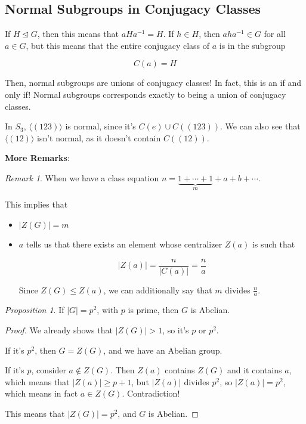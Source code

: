 \documentclass[12pt]{article}
\newcommand{\lr}[1]{\langle #1 \rangle}
\theoremstyle{remark}
\newtheorem{proposition}{Proposition}
\theoremstyle{remark}
\theoremstyle{remark}
\theoremstyle{remark}
\newtheorem*{remark}{Remark}
\theoremstyle{remark}
\begin{document}
\subsection{Normal Subgroups in Conjugacy Classes}

If $H \trianglelefteq G$, then this means that $aHa^{-1} = H$. If $h \in H$,
then $aha^{-1} \in G$ for all $a \in G$, but this means that the entire
conjugacy class of $a$ is in the subgroup

\[
  C(a) = H
\]

Then, normal subgroups are unions of conjugacy classes! In fact, this is an if
and only if! Normal subgroups corresponds exactly to being a union of conjugacy
classes.

In $S_3$, $\lr {(123)}$ is normal, since it's $C(e) \cup C((123))$. We can also
see that $\lr {(12)}$ isn't normal, as it doesn't contain $C((12))$.

{\bf More Remarks}:
\begin{remark}
  When we have a class equation $n = \underbrace{1 + \cdots + 1}_{m} + a + b +
  \cdots$.

  This implies that

  \begin{itemize}
    \item $|Z(G)| = m$
    \item $a$ tells us that there exists an element whose centralizer $Z(a)$ is
      such that

      \[
        |Z(a)| = \frac{n}{|C(a)|} = \frac{n}{a}
      \]

      Since $Z(G) \le Z(a)$, we can additionally say that $m$ divides $\frac{n}{a}$.
  \end{itemize}
\end{remark}

\begin{proposition}
  If $|G| = p^2$, with $p$ is prime, then $G$ is Abelian.
\end{proposition}

\begin{proof}
  We already shows that $|Z(G)| > 1$, so it's $p$ or $p^2$.

  If it's $p^2$, then $G = Z(G)$, and we have an Abelian group.

  If it's $p$, consider $a \not\in Z(G)$. Then $Z(a)$ contains $Z(G)$ and it
  contains $a$, which means that $|Z(a)| \ge p + 1$, but $|Z(a)|$ divides $p^2$,
  so $|Z(a)| = p^2$, which means in fact $a \in Z(G)$. Contradiction!

  This means that $|Z(G)| = p^2$, and $G$ is Abelian.
\end{proof}
\end{document}
